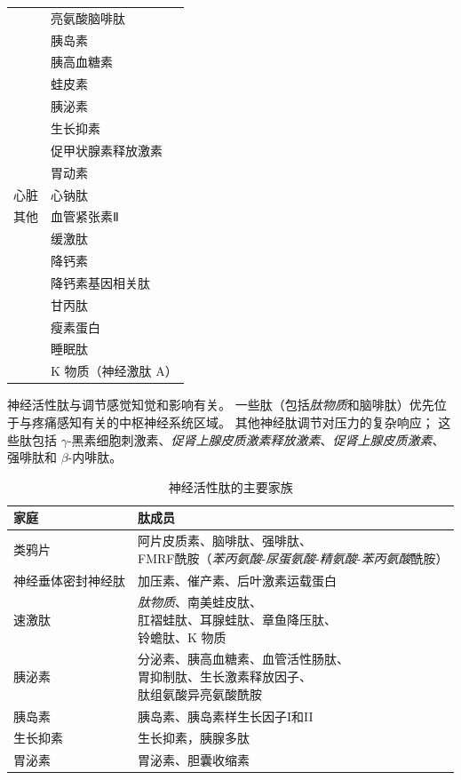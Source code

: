 \begin{table}[htbp]
\begin{tabular}{ll}
		 & 亮氨酸脑啡肽   \\
		 & 胰岛素   \\
		 & 胰高血糖素   \\
		 & 蛙皮素   \\
		 & 胰泌素   \\
		 & 生长抑素   \\
		 & 促甲状腺素释放激素   \\
		 & 胃动素   \\
		心脏 & 心钠肽   \\
		其他 & 血管紧张素Ⅱ   \\
		 & 缓激肽   \\
		 & 降钙素   \\
		 & 降钙素基因相关肽   \\
		 & 甘丙肽   \\
		 & 瘦素蛋白   \\
		 & 睡眠肽   \\
		 & K 物质（神经激肽 A）   \\
		\bottomrule
	\end{tabular}
\end{table}


神经活性肽与调节感觉知觉和影响有关。
一些肽（包括\textit{肽物质}和脑啡肽）优先位于与疼痛感知有关的中枢神经系统区域。
其他神经肽调节对压力的复杂响应；
这些肽包括 $\gamma$-黑素细胞刺激素、\textit{促肾上腺皮质激素释放激素}、\textit{促肾上腺皮质激素}、强啡肽和 $\beta$-内啡肽。


\begin{table}[htbp]
	\caption{神经活性肽的主要家族} \label{tab:16_3} \centering
	\begin{tabular}{ll}
		\toprule
		家庭 & 肽成员 \\
		\midrule
		类鸦片 & \makecell[l]{阿片皮质素、脑啡肽、强啡肽、\\FMRF酰胺（\textit{苯丙氨酸}-\textit{尿蛋氨酸}-\textit{精氨酸}-\textit{苯丙氨酸}酰胺）}  \\
		神经垂体密封神经肽 & 加压素、催产素、后叶激素运载蛋白  \\
		速激肽 & \makecell[l]{\textit{肽物质}、南美蛙皮肽、\\肛褶蛙肽、耳腺蛙肽、章鱼降压肽、\\铃蟾肽、K 物质}  \\
		胰泌素 & \makecell[l]{分泌素、胰高血糖素、血管活性肠肽、\\胃抑制肽、生长激素释放因子、\\肽组氨酸异亮氨酸酰胺}  \\
		胰岛素 & 胰岛素、胰岛素样生长因子I和II  \\
		生长抑素 & 生长抑素，胰腺多肽  \\
		胃泌素 & 胃泌素、胆囊收缩素  \\
		\bottomrule
	\end{tabular}
\end{table}


